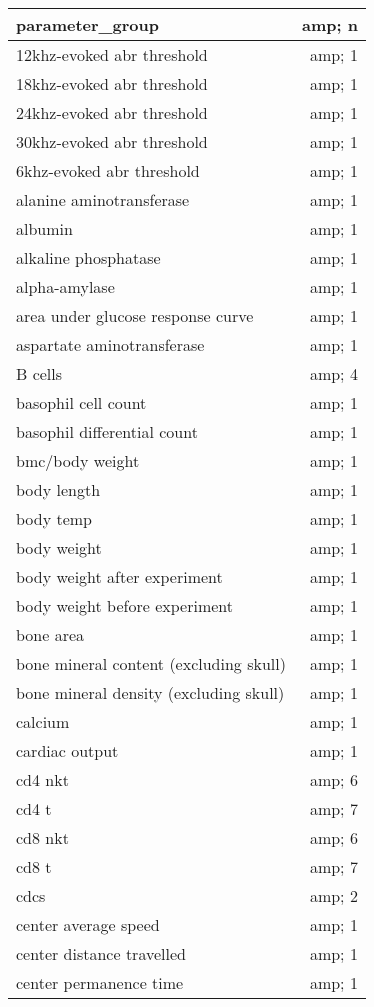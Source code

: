 \documentclass[]{article}
\begin{document}
\begin{tabular}[t]{l|r}
\hline
parameter\_group &amp; n\\
\hline
12khz-evoked abr threshold &amp; 1\\
\hline
18khz-evoked abr threshold &amp; 1\\
\hline
24khz-evoked abr threshold &amp; 1\\
\hline
30khz-evoked abr threshold &amp; 1\\
\hline
6khz-evoked abr threshold &amp; 1\\
\hline
alanine aminotransferase &amp; 1\\
\hline
albumin &amp; 1\\
\hline
alkaline phosphatase &amp; 1\\
\hline
alpha-amylase &amp; 1\\
\hline
area under glucose response curve &amp; 1\\
\hline
aspartate aminotransferase &amp; 1\\
\hline
B cells &amp; 4\\
\hline
basophil cell count &amp; 1\\
\hline
basophil differential count &amp; 1\\
\hline
bmc/body weight &amp; 1\\
\hline
body length &amp; 1\\
\hline
body temp &amp; 1\\
\hline
body weight &amp; 1\\
\hline
body weight after experiment &amp; 1\\
\hline
body weight before experiment &amp; 1\\
\hline
bone area &amp; 1\\
\hline
bone mineral content (excluding skull) &amp; 1\\
\hline
bone mineral density (excluding skull) &amp; 1\\
\hline
calcium &amp; 1\\
\hline
cardiac output &amp; 1\\
\hline
cd4 nkt &amp; 6\\
\hline
cd4 t &amp; 7\\
\hline
cd8 nkt &amp; 6\\
\hline
cd8 t &amp; 7\\
\hline
cdcs &amp; 2\\
\hline
center average speed &amp; 1\\
\hline
center distance travelled &amp; 1\\
\hline
center permanence time &amp; 1\\

\end{tabular}
\end{document}
